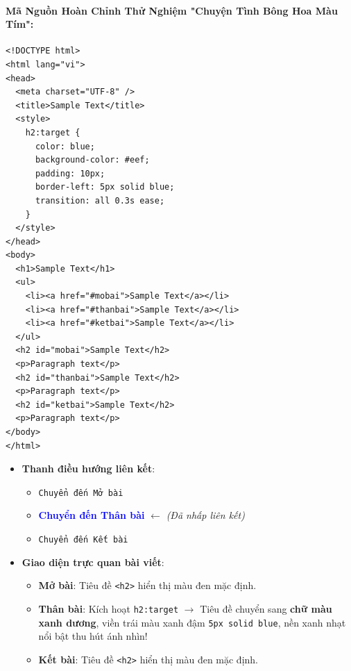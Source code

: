\documentclass[11pt,oneside]{book}
\newcommand{\codeinline}[1]{\textcolor{accentOrange}{\texttt{#1}}}
\begin{document}
\paragraph{Mã Nguồn Hoàn Chỉnh Thử Nghiệm "Chuyện Tình Bông Hoa Màu Tím":}

\begin{codeWindow}
\begin{lstlisting}[language=HTML5]
<!DOCTYPE html>
<html lang="vi">
<head>
  <meta charset="UTF-8" />
  <title>Sample Text</title>
  <style>
    h2:target {
      color: blue;
      background-color: #eef;
      padding: 10px;
      border-left: 5px solid blue;
      transition: all 0.3s ease;
    }
  </style>
</head>
<body>
  <h1>Sample Text</h1>
  <ul>
    <li><a href="#mobai">Sample Text</a></li>
    <li><a href="#thanbai">Sample Text</a></li>
    <li><a href="#ketbai">Sample Text</a></li>
  </ul>
  <h2 id="mobai">Sample Text</h2>
  <p>Paragraph text</p>
  <h2 id="thanbai">Sample Text</h2>
  <p>Paragraph text</p>
  <h2 id="ketbai">Sample Text</h2>
  <p>Paragraph text</p>
</body>
</html>
\end{lstlisting}
\end{codeWindow}

\begin{browserWindow}
\sffamily\small
\begin{itemize}[leftmargin=1.5em, itemsep=3pt, parsep=0pt]
    \item \textbf{Thanh điều hướng liên kết}:
    \begin{itemize}[leftmargin=1.2em, itemsep=2pt]
        \item \codeinline{Chuyển đến Mở bài}
        \item \textcolor{blue}{\textbf{Chuyển đến Thân bài}} $\leftarrow$ \textit{(Đã nhấp liên kết)}
        \item \codeinline{Chuyển đến Kết bài}
    \end{itemize}
    \item \textbf{Giao diện trực quan bài viết}:
    \begin{itemize}[leftmargin=1.2em, itemsep=2pt]
        \item \textbf{Mở bài}: Tiêu đề \codeinline{<h2>} hiển thị màu đen mặc định.
        \item \textbf{Thân bài}: Kích hoạt \codeinline{h2:target} $\rightarrow$ Tiêu đề chuyển sang \textbf{chữ màu xanh dương}, viền trái màu xanh đậm \codeinline{5px solid blue}, nền xanh nhạt nổi bật thu hút ánh nhìn!
        \item \textbf{Kết bài}: Tiêu đề \codeinline{<h2>} hiển thị màu đen mặc định.
    \end{itemize}
\end{itemize}
\end{browserWindow}
\end{document}
